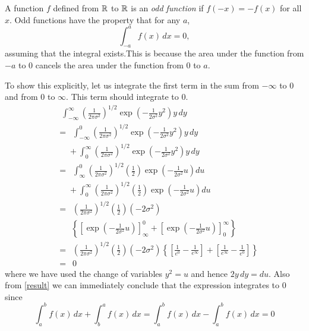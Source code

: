 A function $f$ defined from $\operatorname{\mathbb{R}}$ to $\operatorname{\mathbb{R}}$ is an \textit{odd function} if $f(-x) = -f(x)$ for all $x$. Odd functions have the property that for any $a$, $$\int_{-a}^{a}f(x)\,dx = 0,$$ assuming that the integral exists.This is because the area under the function from
$-a$ to 0 cancels the area under the function from 0 to $a$.

To show this explicitly, let us integrate the first term in the sum from $-\infty$ to 0 and from 0 to $\infty$. This term should integrate to 0. 
\begin{align*}
& \,\,\,\int_{-\infty}^{\infty} \left(\frac{1}{2\pi\sigma^2}\right)^{1/2}\exp\left(-\frac{1}{2\sigma^2}y^2\right)y\,dy\\
&=\,\,\,\int_{-\infty}^{0} \left(\frac{1}{2\pi\sigma^2}\right)^{1/2}\exp\left(-\frac{1}{2\sigma^2}y^2\right)y\,dy\\ &\,\,\,\,\,\,\,\,+ \int_{0}^{\infty} \left(\frac{1}{2\pi\sigma^2}\right)^{1/2}\exp\left(-\frac{1}{2\sigma^2}y^2\right)y\,dy\\
&=\,\,\,\int_{\infty}^{0} \left(\frac{1}{2\pi\sigma^2}\right)^{1/2}\left(\frac{1}{2}\right)\exp\left(-\frac{1}{2\sigma^2}u\right)du\\ &\,\,\,\,\,\,\,\,+ \int_{0}^{\infty} \left(\frac{1}{2\pi\sigma^2}\right)^{1/2}\left(\frac{1}{2}\right)\exp\left(-\frac{1}{2\sigma^2}u\right)du \tag{i}\label{result}\\
&=\,\,\,\left(\frac{1}{2\pi\sigma^2}\right)^{1/2}\left(\frac{1}{2}\right)\left(-{2\sigma^2}\right)\\ &\,\,\,\,\,\,\,\,\,\,\left\lbrace\left[\exp\left(-\frac{1}{2\sigma^2}u\right)\right]_{\infty}^{0} + \left[\exp\left(-\frac{1}{2\sigma^2}u\right)\right]_{0}^{\infty}\right\rbrace\\
&=\,\,\,\left(\frac{1}{2\pi\sigma^2}\right)^{1/2}\left(\frac{1}{2}\right)\left(-{2\sigma^2}\right)\left\lbrace\left[\frac{1}{e^0}-\frac{1}{e^\infty}\right] + \left[\frac{1}{e^\infty}-\frac{1}{e^0}\right]\right\rbrace\\
&=\,\,\,0
\end{align*}
where we have used the change of variables $y^2=u$ and hence $2y\,dy=du$. Also from \eqref{result} we can immediately conclude that the expression integrates to 0 since $$\int_{a}^{b} f(x)\, dx + \int_{b}^{a} f(x)\, dx = \int_{a}^{b} f(x)\, dx - \int_{a}^{b} f(x)\, dx = 0$$